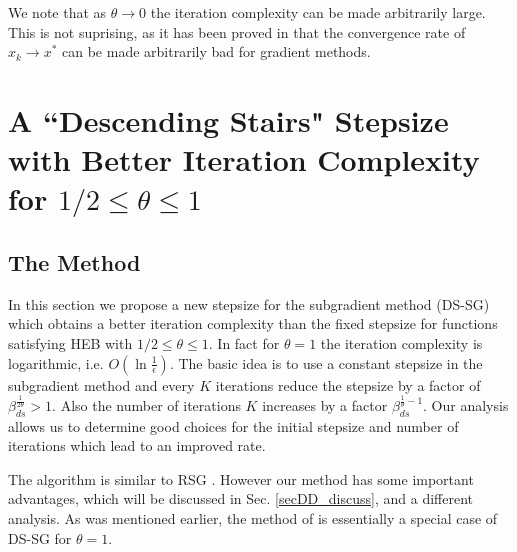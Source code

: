 \documentclass[smallextended]{svjour3}
\begin{document}
    
    
    We note that as $\theta\to 0$ the iteration complexity can be made arbitrarily large. This is not suprising, as it has been proved in \cite[p. 167-168]{PolyakIntro} that the convergence rate of $x_k\to x^*$ can be made arbitrarily bad for gradient methods. 


  
 \section{A ``Descending Stairs" Stepsize with Better Iteration Complexity for $1/2\leq \theta\leq 1$}
 \label{secRest}
 \subsection{The Method}
  In this section we propose a new stepsize for the subgradient method (DS-SG) which obtains a better iteration complexity than the fixed stepsize for functions satisfying HEB with $1/2\leq\theta\leq 1$. In fact for $\theta=1$ the iteration complexity is logarithmic, i.e. $O(\ln\frac{1}{\epsilon})$. 
  The basic idea is to use a constant stepsize in the subgradient method and every $K$ iterations reduce the stepsize by a factor of $\beta_{ds}^{\frac{1}{2\theta}}>1$. Also the number of iterations $K$ increases by a factor $\beta_{ds}^{\frac{1}{\theta}-1}$. Our analysis allows us to determine good choices for the initial stepsize and number of iterations which lead to an improved rate. 
 
 
 The algorithm is similar to RSG \cite{yang2015rsg}. However our  method has some important advantages, which will be discussed in Sec. \ref{secDD_discuss}, and a different analysis. As was mentioned earlier, the method of \cite[Sec. V]{supittayapornpong2016staggered} is essentially a special case of DS-SG for $\theta=1$. 
  
\end{document}
